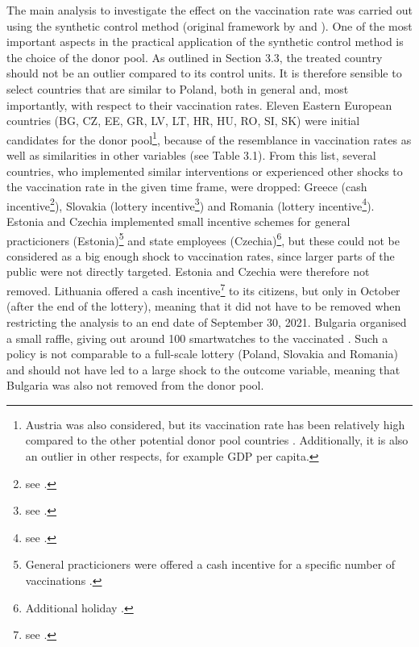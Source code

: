 \documentclass{scrbook}
\begin{document}
The main analysis to investigate the effect on the vaccination rate was
carried out using the synthetic control method (original framework by
\textcite{abadie_economic_2003} and \textcite{abadie_synthetic_2010}).
One of the most important aspects in the practical application of the
synthetic control method is the choice of the donor pool. As outlined in
Section 3.3, the treated country should not be an outlier compared to
its control units. It is therefore sensible to select countries that are
similar to Poland, both in general and, most importantly, with respect
to their vaccination rates. Eleven Eastern European countries (BG, CZ,
EE, GR, LV, LT, HR, HU, RO, SI, SK) were initial candidates for the
donor
pool\footnote{Austria was also considered, but its vaccination rate has been relatively high compared to the other potential donor pool countries \parencite{mathieu_global_2021}. Additionally, it is also an outlier in other respects, for example GDP per capita.},
because of the resemblance in vaccination rates as well as similarities
in other variables (see Table 3.1). From this list, several countries,
who implemented similar interventions or experienced other shocks to the
vaccination rate in the given time frame, were dropped: Greece (cash
incentive\footnote{see \textcite{koutantou_greece_2021}.}), Slovakia
(lottery incentive\footnote{see \textcite{lopatka_slovaks_2021}.}) and
Romania (lottery
incentive\footnote{see \textcite{health_ministry_of_romania_press_2021}.}).
Estonia and Czechia implemented small incentive schemes for general
practicioners
(Estonia)\footnote{General practicioners were offered a cash incentive for a specific number of vaccinations \parencite{baltic_news_network_estonia_2021}.}
and state employees
(Czechia)\footnote{Additional holiday \parencite{euronews_czech_2021}.},
but these could not be considered as a big enough shock to vaccination
rates, since larger parts of the public were not directly targeted.
Estonia and Czechia were therefore not removed. Lithuania offered a cash
incentive\footnote{see \textcite{lithuanian_national_radio_and_television_lithuanian_2021}.}
to its citizens, but only in October (after the end of the lottery),
meaning that it did not have to be removed when restricting the analysis
to an end date of September 30, 2021. Bulgaria organised a small raffle,
giving out around 100 smartwatches to the vaccinated
\parencite{radio_bulgaria_bulgarias_2021}. Such a policy is not
comparable to a full-scale lottery (Poland, Slovakia and Romania) and
should not have led to a large shock to the outcome variable, meaning
that Bulgaria was also not removed from the donor pool.
\end{document}
